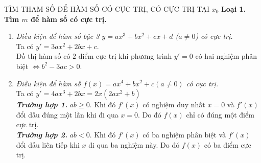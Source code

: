 \setcounter{dang}{1}
\begin{dang}{TÌM THAM SỐ ĐỂ HÀM SỐ CÓ CỰC TRỊ, CÓ CỰC TRỊ TẠI $x_0$}
\textbf{Loại 1. Tìm $m$ để hàm số có cực trị.}
\begin{enumerate}
\item \textit{Điều kiện để hàm số bậc 3 $y=ax^3+bx^2+cx+d$ ($a\neq 0$) có cực trị.}\\
Ta có $y'=3ax^2+2bx+c$.\\
Đồ thị hàm số có $2$ điểm cực trị khi phương trình $y'=0$ có hai nghiệm phân biệt $\Leftrightarrow b^2-3ac>0$.
\item \textit{Điều kiện để hàm số $f(x)=ax^4+bx^2+c(a\neq 0)$ có cực trị.}\\
Ta có $y'=4ax^3+2bx=2x(2ax^2+b)$\\
\textbf{\textit{Trường hợp 1.}} $ab \ge 0$. Khi đó $f'(x)$ có nghiệm duy nhất $x=0$ và $f'(x)$ đổi dấu đúng một lần khi đi qua $x=0$. Do đó $f(x)$ chỉ có đúng một điểm cực trị.\\
\textbf{\textit{Trường hợp 2.}} $ab<0$. Khi đó $f'(x)$ có ba nghiệm phân biệt và $f'(x)$ đổi dấu liên tiếp khi $x$ đi qua ba nghiệm này. Do đó $f(x)$ có ba điểm cực trị.
\end{enumerate}

\end{dang}
